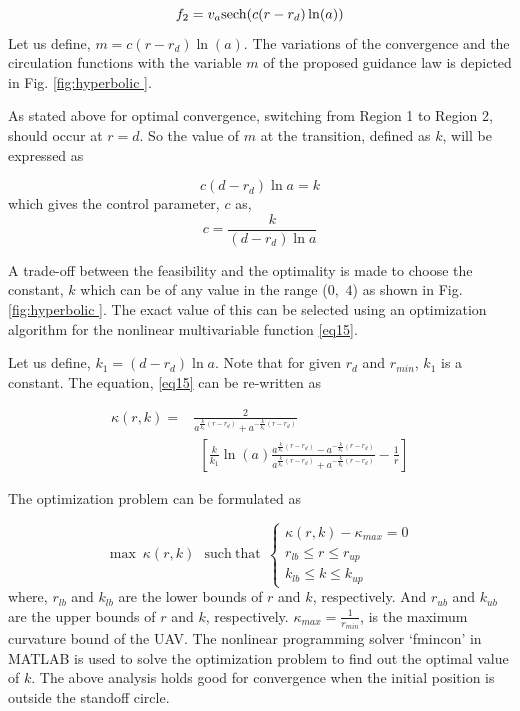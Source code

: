 \documentclass[Afour,sagev,times]{sagej}
\begin{document}
\begin{equation}
{f_2} = v_{a}{\mathop{\rm sech}\nolimits} (c(r - {r_d})\ln (a))
\end{equation}
Let us define, $m=c(r - {r_d})\ln (a)$.
The variations of the convergence and the circulation functions with the variable $m$ of the proposed guidance law is depicted in Fig. \ref{fig:hyperbolic }.

As stated above for optimal convergence, switching from Region 1 to Region 2, should occur at $r=d$. So the value of $m$ at the transition, defined as $k$, will be expressed as

\begin{equation}
{c}({{d - {r_d}}})\ln{a}=k
\end{equation}
which gives the control parameter, $c$ as,
\begin{equation}\label{cdesign}
c = \frac{k}{({{d - {r_d}}})\ln{a}}
\end{equation}

A trade-off between the feasibility and the optimality is made to choose the constant, $k$ which can be of any value in the range ($0$,~$4$) as shown in  Fig. \ref{fig:hyperbolic }. The exact value of this can be selected using an optimization algorithm for the nonlinear multivariable function \eqref{eq15}.

Let us define, $k_1=({{d - {r_d}}})\ln{a}$. Note that for given $r_d$ and $r_{min}$, $k_1$ is a constant. The equation, \eqref{eq15} can be re-written as 


\begin{equation}
\begin{split}
\kappa(r,k)= & \frac{2}{{{a^{\frac{k}{k_1}(r - {r_d})}} + {a^{ - \frac{k}{k_1}(r - {r_d})}}}}~~~~~~~\\
~~~~~~~& ~~\left[ {\frac{k}{k_1}\ln (a)\frac{{{a^{\frac{k}{k_1}(r - {r_d})}} - {a^{ - \frac{k}{k_1}(r - {r_d})}}}}{{{a^{\frac{k}{k_1}(r - {r_d})}} + {a^{ - \frac{k}{k_1}(r - {r_d})}}}} - \frac{1}{r}} \right]
\end{split}
\end{equation}




The optimization problem can be formulated as

\begin{equation}
\max~\kappa (r,k)
~~~\mathrm{such~that}~~  \left\{ {\begin{array}{*{20}{c}}
	{\kappa(r,k)}-\kappa_{max}=0\\ 
	r_{lb} \leq r\leq r_{up}
\\ 
	k_{lb} \leq k\leq k_{up}
	\end{array}} \right.
\end{equation}
where, $r_{lb}$ and $k_{lb}$ are the lower bounds of $r$ and $k$, respectively. And $r_{ub}$ and $k_{ub}$ are the upper bounds of  $r$ and $k$, respectively. $\kappa_{max}=\frac{1}{r_{min}}$, is the maximum curvature bound of the UAV. The nonlinear programming solver `fmincon' in MATLAB is used to solve the optimization problem to find out the optimal value of $k$. The above analysis holds good for convergence when the initial position is outside the standoff circle.
\end{document}
